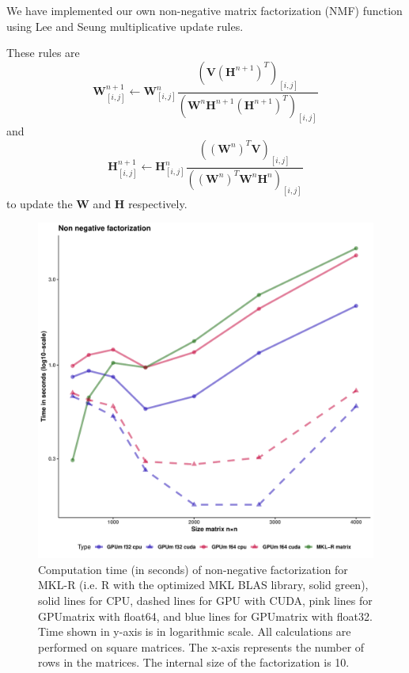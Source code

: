 We have implemented our own non-negative matrix factorization (NMF) function using Lee and Seung\citep{Lee1999} multiplicative update rules.

These rules are \[
\mathbf{W}_{[i, j]}^{n+1} \leftarrow \mathbf{W}_{[i, j]}^n \frac{\left(\mathbf{V}\left(\mathbf{H}^{n+1}\right)^T\right)_{[i, j]}}{\left(\mathbf{W}^n \mathbf{H}^{n+1}\left(\mathbf{H}^{n+1}\right)^T\right)_{[i, j]}}
\] and \[
\mathbf{H}_{[i, j]}^{n+1} \leftarrow \mathbf{H}_{[i, j]}^n \frac{\left(\left(\mathbf{W}^n\right)^T \mathbf{V}\right)_{[i, j]}}{\left(\left(\mathbf{W}^n\right)^T \mathbf{W}^n \mathbf{H}^n\right)_{[i, j]}}
\] to update the \(\mathbf{W}\) and \(\mathbf{H}\) respectively.

\begin{figure}
\includegraphics[width=1\linewidth,height=0.5\textheight]{figures/plotNMFgpumatrix} \caption{Computation time (in seconds) of non-negative factorization for MKL-R (i.e. R with the optimized MKL BLAS library, solid green), solid lines for CPU, dashed lines for GPU with CUDA, pink lines for GPUmatrix with float64, and blue lines for GPUmatrix with float32. Time shown in y-axis is in logarithmic scale. All calculations are performed on square matrices. The x-axis represents the number of rows in the matrices. The internal size of the factorization is 10.}\label{fig:plotNMFgpumatrix}
\end{figure}

